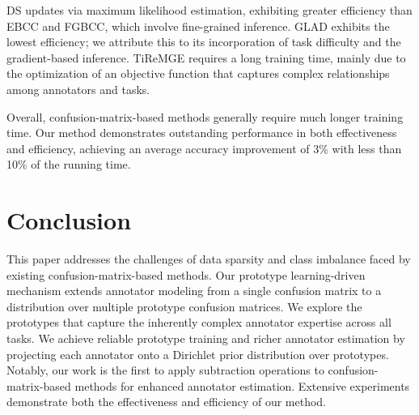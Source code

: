 \documentclass[letterpaper]{article} %
\begin{document}
DS updates via maximum likelihood estimation, exhibiting greater efficiency than EBCC and FGBCC, which involve fine-grained inference. GLAD exhibits the lowest efficiency; we attribute this to its incorporation of task difficulty and the gradient-based inference. TiReMGE requires a long training time, mainly due to the optimization of an objective function that captures complex relationships among annotators and tasks.

Overall, confusion-matrix-based methods generally require much longer training time. Our method demonstrates outstanding performance in both effectiveness and efficiency, achieving an average accuracy improvement of 3\% with less than 10\% of the running time.
\section{Conclusion}
This paper addresses the challenges of data sparsity and class imbalance faced by existing confusion-matrix-based methods. Our prototype learning-driven mechanism extends annotator modeling from a single confusion matrix to a distribution over multiple prototype confusion matrices. We explore the prototypes that capture the inherently complex annotator expertise across all tasks. We achieve reliable prototype training and richer annotator estimation by projecting each annotator onto a Dirichlet prior distribution over prototypes. Notably, our work is the first to apply subtraction operations to confusion-matrix-based methods for enhanced annotator estimation. Extensive experiments demonstrate both the effectiveness and efficiency of our method.




%
\end{document}
